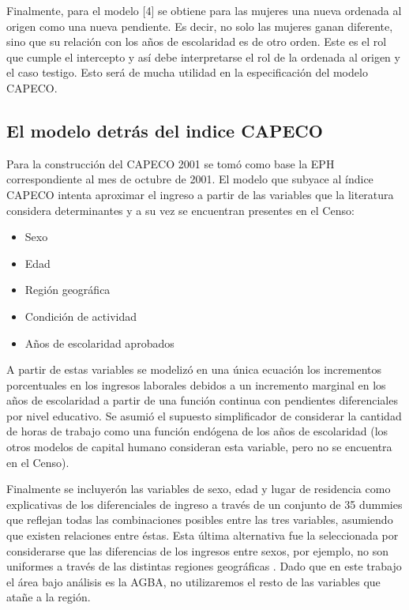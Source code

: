Finalmente, para el modelo [4] se obtiene para las mujeres una nueva ordenada al origen como una nueva pendiente. Es decir, no solo las mujeres ganan diferente, sino que su relación con los años de escolaridad es de otro orden. Este es el rol que cumple el intercepto y así debe interpretarse el rol de la ordenada al origen y el caso testigo. Esto será de mucha utilidad en la especificación del modelo CAPECO.

\subsection{El modelo detrás del indice CAPECO} \label{cap2-modeloCapeco}

Para la construcción del CAPECO 2001 se tomó como base la EPH correspondiente al mes de octubre de 2001. El modelo que subyace al índice CAPECO intenta aproximar el ingreso a partir de las variables que la literatura considera determinantes y a su vez se encuentran presentes en el Censo: 

\begin{itemize}
	\item Sexo 
	\item Edad
	\item Región geográfica
	\item Condición de actividad
	\item Años de escolaridad aprobados
\end{itemize}

A partir de estas variables se modelizó en una única ecuación los incrementos porcentuales en los ingresos laborales debidos a un incremento marginal en los años de escolaridad a partir de una función continua con pendientes diferenciales por nivel educativo. Se asumió el supuesto simplificador de considerar la cantidad de horas de trabajo como una función endógena de los años de escolaridad (los otros modelos de capital humano consideran esta variable, pero no se encuentra en el Censo).

Finalmente se incluyerón las variables de sexo, edad y lugar de residencia como explicativas de los diferenciales de ingreso a través de un conjunto de 35 dummies que reflejan todas las
combinaciones posibles entre las tres variables, asumiendo que existen relaciones entre
éstas. Esta última alternativa fue la seleccionada por considerarse que las diferencias de
los ingresos entre sexos, por ejemplo, no son uniformes a través de las distintas regiones
geográficas \cite{indec2004}. Dado que en este trabajo el área bajo análisis es la AGBA, no utilizaremos el resto de las variables que atañe a la región.

